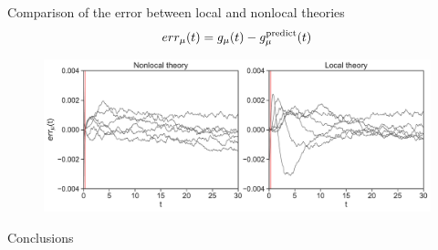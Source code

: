 \documentclass{beamer}
\begin{document}
\begin{frame}{Comparison of the error between local and nonlocal theories}
  \begin{align}
  err_\mu(t)=  g_\mu(t)-g^{\rm predict}_\mu(t)
    \nonumber
  \end{align}
    \begin{figure}
\includegraphics[width=\linewidth]{errors-17nodes-WALLS-defense}
\end{figure}
\end{frame}

\begin{frame}{Conclusions}

\end{frame}
\end{document}
